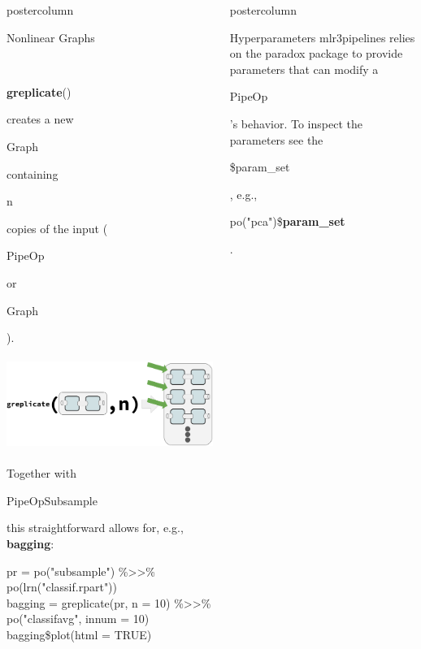\documentclass{beamer}
\newlength{\columnheight} %
\newcommand{\codeinline}[1]{\begin{codeboxinline}#1\end{codeboxinline}}
\begin{document}
\begin{frame}[fragile]{}
\begin{columns}
\begin{column}{.245\textwidth}
\begin{beamercolorbox}[center]{postercolumn}
\begin{minipage}{.98\textwidth}
{\begin{myblock}{Nonlinear Graphs}
\begin{codeboxexample}
              \end{codeboxexample}
              \ \\
              \codeinline{\textbf{greplicate}()} creates a new \codeinline{Graph} containing \codeinline{n} copies of the input (\codeinline{PipeOp} or \codeinline{Graph}). \\
              \ \\
              \includegraphics[width=\textwidth]{img/greplicate.png}
              \ \\
              Together with \codeinline{PipeOpSubsample} this straightforward allows for, e.g., \textbf{bagging}:
              \begin{codeboxexample}
						    {\footnotesize
                  pr = po("subsample") \%>>\% po(lrn("classif.rpart")) \\
                  bagging = greplicate(pr, n = 10) \%>>\%\\
                  \hspace*{1ex} po("classifavg", innum = 10)\\
                  bagging\$plot(html = TRUE)}
					    \end{codeboxexample}
            \end{myblock}
						\vfill}
				\end{minipage}
			\end{beamercolorbox}
		\end{column}
    \begin{column}{.245\textwidth}
			\begin{beamercolorbox}[center]{postercolumn}
				\begin{minipage}{.98\textwidth}
					\parbox[t][\columnheight]{\textwidth}{
            \begin{myblock}{Hyperparameters}
              mlr3pipelines relies on the paradox package to provide parameters that can modify a \codeinline{PipeOp}'s behavior. To inspect the parameters see the \codeinline{\$param\_set}, e.g., \codeinline{po("pca")\$\textbf{param\_set}}.\\

\end{myblock}}
\end{minipage}
\end{beamercolorbox}
\end{column}
\end{columns}
\end{frame}
\end{document}
